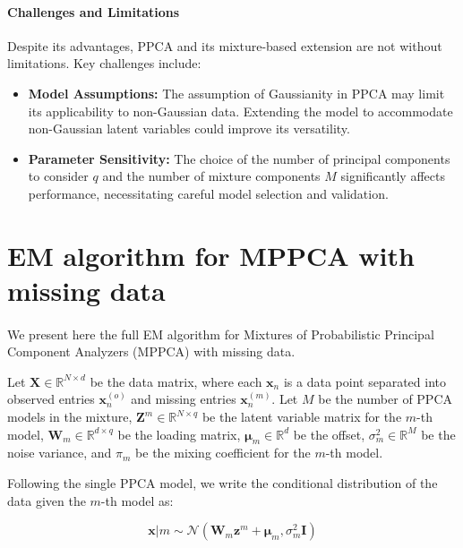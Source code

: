 \documentclass{article}
\newcommand{\R}{\mathbb{R}}
\begin{document}
\paragraph{Challenges and Limitations} Despite its advantages, PPCA and its mixture-based extension are not without limitations. Key challenges include:
\begin{itemize}
    \item \textbf{Model Assumptions:} The assumption of Gaussianity in PPCA may limit its applicability to non-Gaussian data. Extending the model to accommodate non-Gaussian latent variables could improve its versatility.
    \item \textbf{Parameter Sensitivity:} The choice of the number of principal components to consider $q$ and the number of mixture components $M$ significantly affects performance, necessitating careful model selection and validation.
\end{itemize}




\newpage
\appendix

\section{EM algorithm for MPPCA with missing data}
\label{app:mppca_EM}

\paragraph{} We present here the full EM algorithm for Mixtures of Probabilistic Principal Component Analyzers (MPPCA) with missing data.

Let $\mathbf{X} \in \R^{N \times d}$ be the data matrix, where each $\mathbf{x}_n$ is a data point separated into observed entries $\mathbf{x}_n^{(o)}$ and missing entries $\mathbf{x}_n^{(m)}$. Let $M$ be the number of PPCA models in the mixture, $\mathbf{Z}^m \in \R^{N \times q}$ be the latent variable matrix for the $m$-th model, $\mathbf{W}_m \in \R^{d \times q}$ be the loading matrix, $\boldsymbol{\mu}_m \in \R^d$ be the offset, $\sigma_m^2 \in \R^M$ be the noise variance, and $\pi_m$ be the mixing coefficient for the $m$-th model.

Following the single PPCA model, we write the conditional distribution of the data given the $m$-th model as:

\begin{equation}
    \label{eq:mppca_EM_conditional}
    \mathbf{x} | m \sim \mathcal{N}(\mathbf{W}_m\mathbf{z}^m + \boldsymbol{\mu}_m, \sigma_m^2\mathbf{I})
\end{equation}
\end{document}
